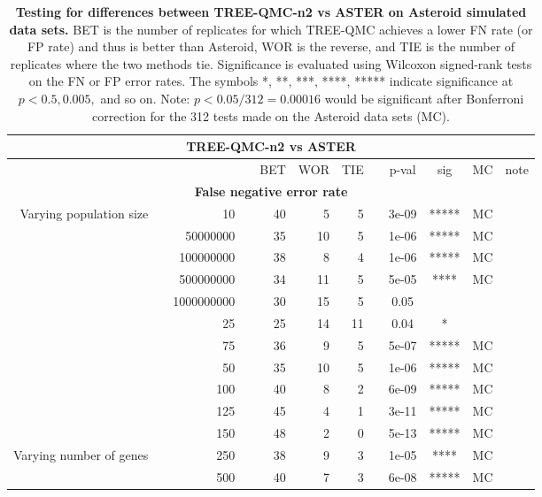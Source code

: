 \begin{table}[!h]
\caption[Statistical testing for TREE-QMC-n2 vs ASTER on Asteroid data]{
\textbf{Testing for differences between TREE-QMC-n2 vs ASTER on Asteroid simulated data sets.}
BET is the number of replicates for which TREE-QMC achieves a lower FN rate (or FP rate) and thus is better than Asteroid, WOR is the reverse, and TIE is the number of replicates where the two methods tie.
Significance is evaluated using Wilcoxon signed-rank tests on the FN or FP error rates.
The symbols *, **, ***, ****, ***** indicate significance at $p < 0.5, 0.005,$ and so on.
Note: $p < 0.05 / 312 = 0.00016$ would be significant after Bonferroni correction for the 312 tests made on the Asteroid data sets (MC).}
\centering
\scriptsize
\begin{tabular}{r r r l r r r l c c c l}
\toprule 
\multicolumn{12}{c}{\textbf{TREE-QMC-n2 vs ASTER}} \\
\midrule
\multirow{ 1}{2cm}{}
& & & & BET & WOR & TIE & & p-val & sig & MC & note \\
\midrule
\multicolumn{12}{c}{\textbf{False negative error rate}} \\
\midrule
\multirow{ 6}{2cm}{Varying population size}
 & & 10 & & 40 & 5 & 5 & & 3e-09 & ***** & MC &  \\
   & & 50000000 & & 35 & 10 & 5 & & 1e-06 & ***** & MC &  \\
   & & 100000000 & & 38 & 8 & 4 & & 1e-06 & ***** & MC &  \\
   & & 500000000 & & 34 & 11 & 5 & & 5e-05 & **** & MC &  \\
   & & 1000000000 & & 30 & 15 & 5 & & 0.05 &  &  &  \\
\midrule
\multirow{ 6}{2cm}{Varying number of taxa}
   & & 25 & & 25 & 14 & 11 & & 0.04 & * &  &  \\
   & & 75 & & 36 & 9 & 5 & & 5e-07 & ***** & MC &  \\
   & & 50 & & 35 & 10 & 5 & & 1e-06 & ***** & MC &  \\
   & & 100 & & 40 & 8 & 2 & & 6e-09 & ***** & MC &  \\
   & & 125 & & 45 & 4 & 1 & & 3e-11 & ***** & MC &  \\
   & & 150 & & 48 & 2 & 0 & & 5e-13 & ***** & MC &  \\
\midrule
\multirow{ 4}{2cm}{Varying number of genes}
   & & 250 & & 38 & 9 & 3 & & 1e-05 & **** & MC &  \\
   & & 500 & & 40 & 7 & 3 & & 6e-08 & ***** & MC &  \\

\end{tabular}
\end{table}
